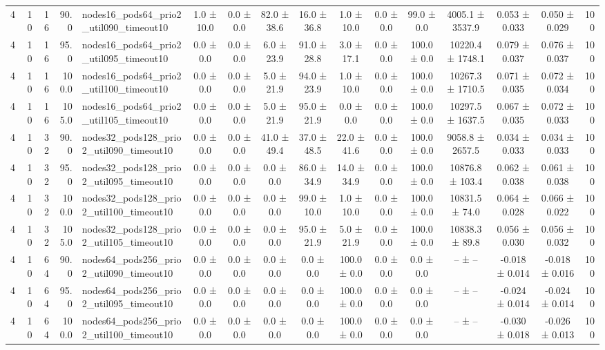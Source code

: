 \begin{tabular}{r r r r l c c c c c c c c c c r}
4 & 10 & 16 & 90.0 & nodes16\_pods64\_prio2\_util090\_timeout10 & 1.0 ± 10.0 & 0.0 ± 0.0 & 82.0 ± 38.6 & 16.0 ± 36.8 & 1.0 ± 10.0 & 0.0 ± 0.0 & 99.0 ± 0.0 & 4005.1 ± 3537.9 & 0.053 ± 0.033 & 0.050 ± 0.029 & 100 \\
4 & 10 & 16 & 95.0 & nodes16\_pods64\_prio2\_util095\_timeout10 & 0.0 ± 0.0 & 0.0 ± 0.0 & 6.0 ± 23.9 & 91.0 ± 28.8 & 3.0 ± 17.1 & 0.0 ± 0.0 & 100.0 ± 0.0 & 10220.4 ± 1748.1 & 0.079 ± 0.037 & 0.076 ± 0.037 & 100 \\
4 & 10 & 16 & 100.0 & nodes16\_pods64\_prio2\_util100\_timeout10 & 0.0 ± 0.0 & 0.0 ± 0.0 & 5.0 ± 21.9 & 94.0 ± 23.9 & 1.0 ± 10.0 & 0.0 ± 0.0 & 100.0 ± 0.0 & 10267.3 ± 1710.5 & 0.071 ± 0.035 & 0.072 ± 0.034 & 100 \\
4 & 10 & 16 & 105.0 & nodes16\_pods64\_prio2\_util105\_timeout10 & 0.0 ± 0.0 & 0.0 ± 0.0 & 5.0 ± 21.9 & 95.0 ± 21.9 & 0.0 ± 0.0 & 0.0 ± 0.0 & 100.0 ± 0.0 & 10297.5 ± 1637.5 & 0.067 ± 0.035 & 0.072 ± 0.033 & 100 \\
4 & 10 & 32 & 90.0 & nodes32\_pods128\_prio2\_util090\_timeout10 & 0.0 ± 0.0 & 0.0 ± 0.0 & 41.0 ± 49.4 & 37.0 ± 48.5 & 22.0 ± 41.6 & 0.0 ± 0.0 & 100.0 ± 0.0 & 9058.8 ± 2657.5 & 0.034 ± 0.033 & 0.034 ± 0.033 & 100 \\
4 & 10 & 32 & 95.0 & nodes32\_pods128\_prio2\_util095\_timeout10 & 0.0 ± 0.0 & 0.0 ± 0.0 & 0.0 ± 0.0 & 86.0 ± 34.9 & 14.0 ± 34.9 & 0.0 ± 0.0 & 100.0 ± 0.0 & 10876.8 ± 103.4 & 0.062 ± 0.038 & 0.061 ± 0.038 & 100 \\
4 & 10 & 32 & 100.0 & nodes32\_pods128\_prio2\_util100\_timeout10 & 0.0 ± 0.0 & 0.0 ± 0.0 & 0.0 ± 0.0 & 99.0 ± 10.0 & 1.0 ± 10.0 & 0.0 ± 0.0 & 100.0 ± 0.0 & 10831.5 ± 74.0 & 0.064 ± 0.028 & 0.066 ± 0.022 & 100 \\
4 & 10 & 32 & 105.0 & nodes32\_pods128\_prio2\_util105\_timeout10 & 0.0 ± 0.0 & 0.0 ± 0.0 & 0.0 ± 0.0 & 95.0 ± 21.9 & 5.0 ± 21.9 & 0.0 ± 0.0 & 100.0 ± 0.0 & 10838.3 ± 89.8 & 0.056 ± 0.030 & 0.056 ± 0.032 & 100 \\
4 & 10 & 64 & 90.0 & nodes64\_pods256\_prio2\_util090\_timeout10 & 0.0 ± 0.0 & 0.0 ± 0.0 & 0.0 ± 0.0 & 0.0 ± 0.0 & 100.0 ± 0.0 & 0.0 ± 0.0 & 0.0 ± 0.0 & -- ± -- & -0.018 ± 0.014 & -0.018 ± 0.016 & 100 \\
4 & 10 & 64 & 95.0 & nodes64\_pods256\_prio2\_util095\_timeout10 & 0.0 ± 0.0 & 0.0 ± 0.0 & 0.0 ± 0.0 & 0.0 ± 0.0 & 100.0 ± 0.0 & 0.0 ± 0.0 & 0.0 ± 0.0 & -- ± -- & -0.024 ± 0.014 & -0.024 ± 0.014 & 100 \\
4 & 10 & 64 & 100.0 & nodes64\_pods256\_prio2\_util100\_timeout10 & 0.0 ± 0.0 & 0.0 ± 0.0 & 0.0 ± 0.0 & 0.0 ± 0.0 & 100.0 ± 0.0 & 0.0 ± 0.0 & 0.0 ± 0.0 & -- ± -- & -0.030 ± 0.018 & -0.026 ± 0.013 & 100 \\

\end{tabular}
